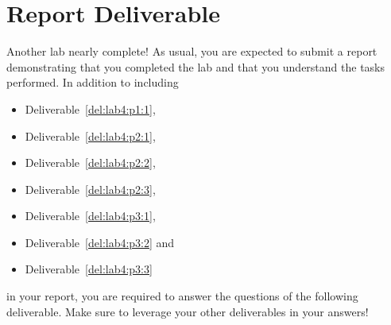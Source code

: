 \section{Report Deliverable}\label{Lab:4:Report}
Another lab nearly complete!
As usual, you are expected to submit a report demonstrating that you completed the lab and that you understand the tasks performed.
In addition to including
\begin{itemize}
  \item{Deliverable~\ref{del:lab4:p1:1},}
  \item{Deliverable~\ref{del:lab4:p2:1},}
  \item{Deliverable~\ref{del:lab4:p2:2},}
  \item{Deliverable~\ref{del:lab4:p2:3},}
  \item{Deliverable~\ref{del:lab4:p3:1},}
  \item{Deliverable~\ref{del:lab4:p3:2} and}
  \item{Deliverable~\ref{del:lab4:p3:3}}
\end{itemize}
in your report, you are required to answer the questions of the following deliverable.
Make sure to leverage your other deliverables in your answers!
